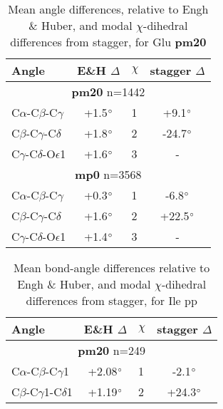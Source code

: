 \begin{table}[h]
\vspace{-10pt}
\begin{tabular}{lc|lc} \\ \toprule
Angle     & E\&H $\Delta$ & $\chi$& stagger $\Delta$ \\ \bottomrule
\multicolumn{4}{c}{\textbf{pm20} n=1442} \\
C$\alpha$-C$\beta$-C$\gamma$  & +1.5$\degree$ & 1 & +9.1$\degree$ \\
C$\beta$-C$\gamma$-C$\delta$  & +1.8$\degree$ & 2 & -24.7$\degree$ \\
C$\gamma$-C$\delta$-O$\epsilon$1 & +1.6$\degree$ & 3 & -\\ \bottomrule
\multicolumn{4}{c}{\textbf{mp0} n=3568} \\
C$\alpha$-C$\beta$-C$\gamma$  & +0.3$\degree$ & 1 & -6.8$\degree$ \\
C$\beta$-C$\gamma$-C$\delta$  & +1.6$\degree$ & 2 & +22.5$\degree$ \\
C$\gamma$-C$\delta$-O$\epsilon$1 & +1.4$\degree$ & 3 & -\\ \bottomrule
\end{tabular}
\vspace{-7pt}
\caption{Mean angle differences, relative to Engh \& Huber, and modal $\chi$-dihedral differences from stagger, for Glu \textbf{pm20}}
\label{glupangles}
\vspace{-10pt}
\end{table}

\bigskip


\begin{table}[h]
\vspace{-15pt}
\begin{tabular}{lc|lc} \\ \toprule
Angle     & E\&H $\Delta$ & $\chi$ & stagger $\Delta$ \\ \bottomrule
\multicolumn{4}{c}{\textbf{pm20} n=249} \\
C$\alpha$-C$\beta$-C$\gamma$1  & +2.08$\degree$ & 1 & -2.1$\degree$ \\
C$\beta$-C$\gamma$1-C$\delta$1 & +1.19$\degree$ & 2 & +24.3$\degree$ \\ \bottomrule
\end{tabular}
\vspace{-5pt}
\caption{Mean bond-angle differences relative to Engh \& Huber, and modal $\chi$-dihedral differences from stagger, for Ile pp}
\label{tab:ilepp}
\vspace{-13pt}
\end{table}

